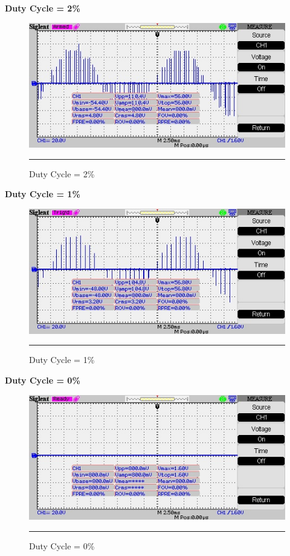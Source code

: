 \textbf{Duty Cycle = 2\%}
\begin{figure}[htbp]
	\centering
	\includegraphics[width = 6in]{./Figures/Photos/Hardware/44}
	\rule{35em}{1pt}
	\caption{Duty Cycle = 2\%}
\end{figure}
\newpage
\textbf{Duty Cycle = 1\%}
\begin{figure}[htbp]
	\centering
	\includegraphics[width = 6in]{./Figures/Photos/Hardware/45}
	\rule{35em}{1pt}
	\caption{Duty Cycle = 1\%}
\end{figure}

\textbf{Duty Cycle = 0\%}
\begin{figure}[htbp]
	\centering
	\includegraphics[width = 6in]{./Figures/Photos/Hardware/46}
	\rule{35em}{1pt}
	\caption{Duty Cycle = 0\%}
\end{figure}
